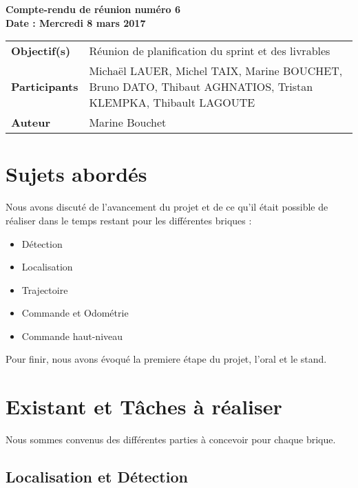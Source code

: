 \documentclass[a4wide,10pt]{article}
\begin{document}
\thispagestyle{empty}

\begin{center}
\LARGE \bfseries  Compte-rendu de réunion numéro 6 \\
\large \bfseries  Date : Mercredi 8 mars 2017

\vspace{0.33cm}
\end{center}

\begin{center}
\begin{tabular}{ p{2.2cm}  p{13.6cm} }
\textbf{Objectif(s)} &  Réunion de planification du sprint et des livrables \\
\textbf{Participants} & Michaël LAUER, Michel TAIX, Marine BOUCHET, Bruno DATO, Thibaut AGHNATIOS, Tristan KLEMPKA, Thibault LAGOUTE \\ 
\textbf{Auteur} & Marine Bouchet  \\
\end{tabular}
\end{center}

\section*{Sujets abordés}

Nous avons discuté de l'avancement du projet et de ce qu'il était possible de réaliser dans le temps restant pour les différentes briques :

\begin{itemize}
\item Détection
\item Localisation 
\item Trajectoire
\item Commande et Odométrie
\item Commande haut-niveau
\end{itemize}

Pour finir, nous avons évoqué la premiere étape du projet, l'oral et le stand.


\section*{Existant et Tâches à réaliser}
Nous sommes convenus des différentes parties à concevoir pour chaque brique.

\subsection*{Localisation et Détection}
\end{document}
